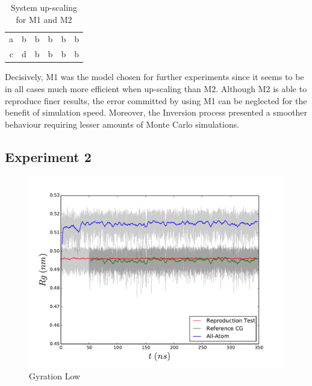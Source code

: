 \documentclass[10pt,a4paper,twoside]{article}
\begin{document}
\begin{table}[ht!] 
  \centering
\begin{threeparttable}

  \caption{System up-scaling for M1 and M2}

\begin{tabular}{|r|c|c|c|c|c|}
\hline
a & b & b & b & b & b\\
c & d & b & b & b & b\\
 \hline
\end{tabular}
  \label{tab:upscale}%
\end{threeparttable} 
\end{table}

Decisively, M1 was the model chosen for further experiments since it seems to be in all cases much more efficient when up-scaling than M2. Although M2 is able to reproduce finer results, the error committed by using M1 can be neglected for the benefit of simulation speed. Moreover, the Inversion process presented a smoother behaviour requiring lesser amounts of Monte Carlo simulations.

\subsection{Experiment 2}
\label{subsec:resexp2}

	   \begin{figure}
  \begin{center}
		\includegraphics[width=0.8 \textwidth]{./graphs/GyraL}
	\caption{Gyration Low}
	\label{gfx:gyrLow}
	\end{center}
	\end{figure}
\end{document}
